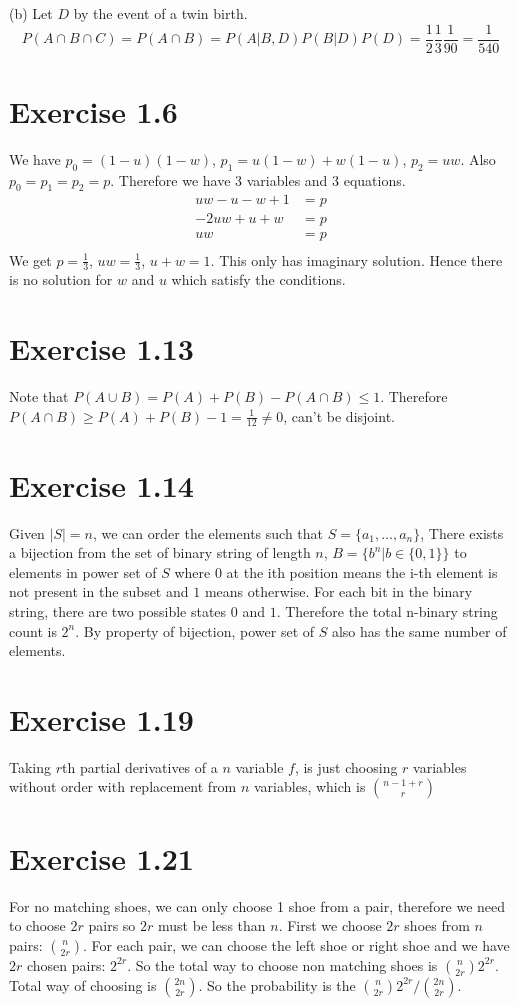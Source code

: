 \documentclass[12pt]{article}
\begin{document}
(b) Let $D$ by the event of a twin birth. $$P(A \cap B \cap C) = P(A \cap B) = P(A | B, D) P(B | D ) P(D) = \frac{1}{2} \frac{1}{3} \frac{1}{90} = \frac{1}{540}  $$

\section*{Exercise 1.6}
We have $p_0 = (1-u)(1-w)$, $p_1 = u(1-w) + w(1-u)$, $p_2 = uw$. Also $p_0=p_1=p_2 = p$. Therefore we have 3 variables and 3 equations. 
$$\begin{aligned}
  uw - u - w + 1 &= p \\
  -2uw + u + w &= p \\
  uw &= p \\
\end{aligned}
$$
We get $p=\frac{1}{3}$, $uw = \frac{1}{3}$, $u + w = 1$. This only has imaginary solution. Hence there is no solution for $w$ and $u$ which satisfy the conditions.

\section*{Exercise 1.13}
Note that $P(A\cup B) = P(A) + P(B) - P(A\cap B) \leq 1$. Therefore $P(A\cap B) \geq P(A) + P(B) - 1 =\frac{1}{12} \neq 0$, can't be disjoint.

\section*{Exercise 1.14}
Given $|S| = n$, we can order the elements such that $S=\{a_1,\ldots, a_n\}$, There exists a bijection from the set of binary string of length $n$, $B = \{b^n|b\in \{0,1\}\}$ to elements in power set of $S$ where $0$ at the ith position means the i-th element is not present in the subset and $1$ means otherwise.  For each bit in the binary string, there are two possible states $0$ and $1$. Therefore the total n-binary string count is $2^n$. By property of bijection, power set of $S$ also has the same number of elements.

\section*{Exercise 1.19}
Taking $r$th partial derivatives of a $n$ variable $f$, is just choosing $r$ variables without order with replacement from $n$ variables, which is ${n-1 + r \choose r}$

\section*{Exercise 1.21}
For no matching shoes, we can only choose 1 shoe from a pair, therefore we need to choose $2r$ pairs so $2r$ must be less than $n$. First we choose $2r$ shoes from $n$ pairs: ${n \choose 2r}$. For each pair, we can choose the left shoe or right shoe and we have $2r$ chosen pairs: $2^{2r}$. So the total way to choose non matching shoes is ${n \choose 2r} 2^{2r}$.  Total way of choosing is ${2n \choose 2r}$. So the probability is the ${n \choose 2r} 2^{2r} / {2n \choose 2r}$.
\end{document}
